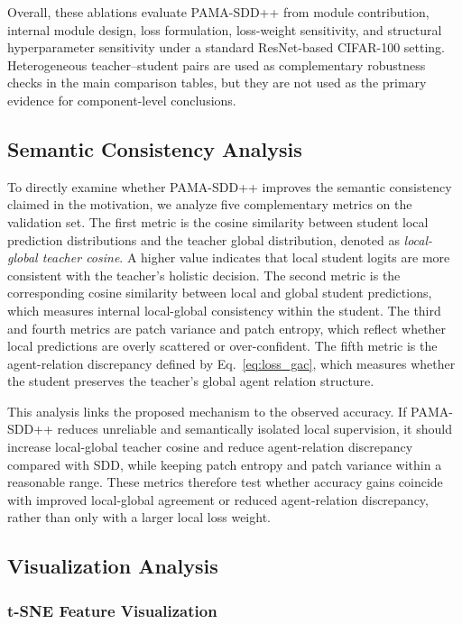 \documentclass[a4paper,fleqn]{cas-dc}
\begin{document}
Overall, these ablations evaluate PAMA-SDD++ from module contribution,
internal module design, loss formulation, loss-weight sensitivity, and
structural hyperparameter sensitivity under a standard ResNet-based CIFAR-100
setting. Heterogeneous teacher--student pairs are used as complementary
robustness checks in the main comparison tables, but they are not used as the
primary evidence for component-level conclusions.

\subsection{Semantic Consistency Analysis}
\label{subsec:semantic_analysis}

To directly examine whether PAMA-SDD++ improves the semantic consistency
claimed in the motivation, we analyze five complementary metrics on the
validation set. The first metric is the cosine similarity between student
local prediction distributions and the teacher global distribution, denoted as
\textit{local-global teacher cosine}. A higher value indicates that local
student logits are more consistent with the teacher's holistic decision. The
second metric is the corresponding cosine similarity between local and global
student predictions, which measures internal local-global consistency within
the student. The third and fourth metrics are patch variance and patch
entropy, which reflect whether local predictions are overly scattered or
over-confident. The fifth metric is the agent-relation discrepancy defined by
Eq.~\eqref{eq:loss_gac}, which measures whether the student preserves the
teacher's global agent relation structure.

This analysis links the proposed mechanism to the observed accuracy. If
PAMA-SDD++ reduces unreliable and semantically isolated local supervision, it
should increase local-global teacher cosine and reduce agent-relation
discrepancy compared with SDD, while keeping patch entropy and patch variance
within a reasonable range. These metrics therefore test whether accuracy gains
coincide with improved local-global agreement or reduced agent-relation
discrepancy, rather than only with a larger local loss weight.

\subsection{Visualization Analysis}
\label{subsec:visualization}

\subsubsection{t-SNE Feature Visualization}
\end{document}
